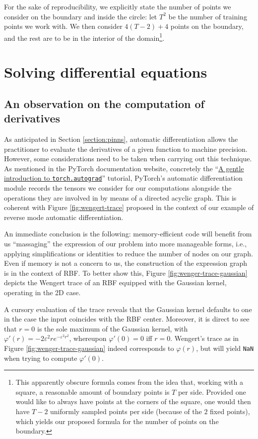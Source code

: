 \documentclass[12pt]{report} %
\begin{document}
For the sake of reproducibility, we explicitly state the number of points we consider on the boundary and inside the circle: let $T^2$ be the number of training points we work with. We then consider $4 (T - 2) + 4$ points on the boundary, and the rest are to be in the interior of the domain\footnote{This apparently obscure formula comes from the idea that, working with a square, a reasonable amount of boundary points is $T$ per side. Provided one would like to always have points at the corners of the square, one would then have $T-2$ uniformly sampled points per side (because of the $2$ fixed points), which yields our proposed formula for the number of points on the boundary.}.

\section*{Solving differential equations}

\subsection*{An observation on the computation of derivatives}

As anticipated in Section \ref{section:pinns}, automatic differentiation allows the
practitioner to evaluate the derivatives of a given function to machine precision.
However, some considerations need to be taken when carrying out this technique.
As mentioned in the PyTorch documentation website, concretely the
``\href{https://pytorch.org/tutorials/beginner/blitz/autograd_tutorial.html}{A gentle
  introduction to \texttt{torch.autograd}}'' tutorial, PyTorch's automatic differentiation
module records the tensors we consider for our computations alongside the operations
they are involved in by means of a directed acyclic graph. This is coherent with
Figure \ref{fig:wengert-trace} proposed in the context of our example of reverse
mode automatic differentiation.

An immediate conclusion is the following: memory-efficient code will benefit from us
``massaging'' the expression of our problem into more manageable forms, i.e., applying
simplifications or identities to reduce the number of nodes on our graph.
Even if memory is not a concern to us, the construction of the expression graph is
in the context of RBF. To better show this, Figure \ref{fig:wenger-trace-gaussian}
depicts the Wengert trace of an RBF equipped with the Gaussian kernel, operating in the 2D
case.

A cursory evaluation of the trace reveals that the Gaussian kernel defaults to one in
the case the input coincides with the RBF center. Moreover, it is direct to see that
$r=0$ is the sole maximum of the Gaussian kernel, with $\varphi'(r)=-2 \varepsilon^2 r
  e^{-\varepsilon^2 r^2}$, whereupon $\varphi'(0)=0$ iff $r=0$. Wengert's trace as in Figure \ref{fig:wenger-trace-gaussian}
indeed corresponds to $\varphi(r)$, but will yield \texttt{NaN} when trying to compute
$\varphi'(0)$.
\end{document}
